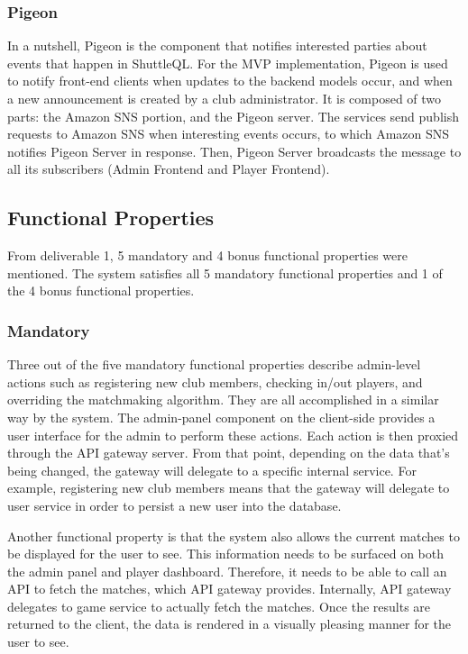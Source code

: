 \documentclass{article}
\begin{document}
\subsubsection{Pigeon}
In a nutshell, Pigeon is the component that notifies interested parties about events that happen in ShuttleQL. For the MVP implementation, Pigeon is used to notify front-end clients when updates to the backend models occur, and when a new announcement is created by a club administrator. It is composed of two parts: the Amazon SNS portion, and the Pigeon server. The services send publish requests to Amazon SNS when interesting events occurs, to which Amazon SNS notifies Pigeon Server in response. Then, Pigeon Server broadcasts the message to all its subscribers (Admin Frontend and Player Frontend).

\subsection{Functional Properties}
From deliverable 1, 5 mandatory and 4 bonus functional properties were mentioned. The system satisfies all 5 mandatory functional properties and 1 of the 4 bonus functional properties.

\subsubsection{Mandatory}
Three out of the five mandatory functional properties describe admin-level actions such as registering new club members, checking in/out players, and overriding the matchmaking algorithm. They are all accomplished in a similar way by the system. The admin-panel component on the client-side provides a user interface for the admin to perform these actions. Each action is then proxied through the API gateway server. From that point, depending on the data that's being changed, the gateway will delegate to a specific internal service. For example, registering new club members means that the gateway will delegate to user service in order to persist a new user into the database.

Another functional property is that the system also allows the current matches to be displayed for the user to see. This information needs to be surfaced on both the admin panel and player dashboard. Therefore, it needs to be able to call an API to fetch the matches, which API gateway provides. Internally, API gateway delegates to game service to actually fetch the matches. Once the results are returned to the client, the data is rendered in a visually pleasing manner for the user to see.
\end{document}
